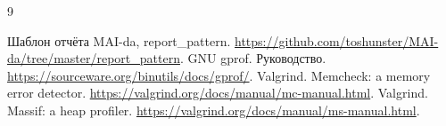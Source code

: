 \begin{thebibliography}{9}
\raggedright
{}
Шаблон отчёта MAI-da, report\_pattern.
\url{https://github.com/toshunster/MAI-da/tree/master/report_pattern}.
GNU gprof. Руководство.
\url{https://sourceware.org/binutils/docs/gprof/}.
Valgrind. Memcheck: a memory error detector.
\url{https://valgrind.org/docs/manual/mc-manual.html}.
Valgrind. Massif: a heap profiler.
\url{https://valgrind.org/docs/manual/ms-manual.html}.
\end{thebibliography}
